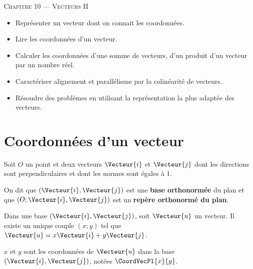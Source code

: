 \documentclass[a4paper]{article}
\begin{document}
\begin{center}
  {\scshape\LARGE Chapitre 10 --- Vecteurs II\par}
\end{center}


\begin{savoirfaire}{}{}
    \begin{itemize}[label=$\square$]
        \item Représenter un vecteur dont on connait les coordonnées.
        \item Lire les coordonnées d’un vecteur.
        \item Calculer les coordonnées d’une somme de vecteurs, d’un produit d’un vecteur par un nombre réel.
        \item Caractériser alignement et parallélisme par la colinéarité de vecteurs.
        \item Résoudre des problèmes en utilisant la représentation la plus adaptée des vecteurs.
    \end{itemize}
\end{savoirfaire}


\section{Coordonnées d'un vecteur}
\begin{definition}{}{}
  Soit $O$ un point et deux vecteurs $\Vecteur{i}$ et $\Vecteur{j}$ dont les directions sont 
  perpendiculaires et dont les normes sont égales à 1.

  On dit que $(\Vecteur{i},\Vecteur{j})$ est une \textbf{base orthonormée} du plan 
  et que $(O;\Vecteur{i},\Vecteur{j})$ est un \textbf{repère orthonormé du plan}.
\end{definition}

\begin{definition}{}{}
  Dans une base $(\Vecteur{i},\Vecteur{j})$, soit $\Vecteur{u}$ un vecteur. Il existe un unique couple $(x;y)$ tel que $\Vecteur{u}=x\Vecteur{i}+y\Vecteur{j}$.


  $x$ et $y$ sont les coordonnées de $\Vecteur{u}$ dans la base $(\Vecteur{i},\Vecteur{j})$, 
  notées $\CoordVecPl{x}{y}$.
\end{definition}
\end{document}
